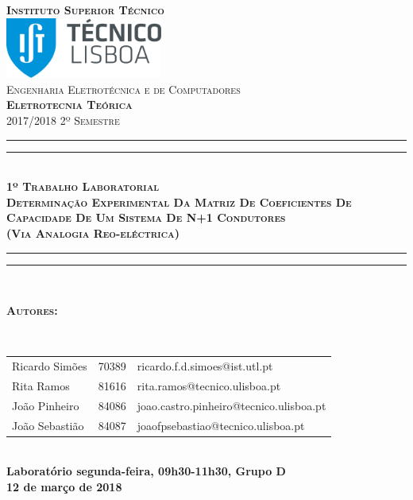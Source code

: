 \documentclass[11pt, a4paper, titlepage, portuguese]{article}
\begin{document}
	\begin{titlepage}
		\center
		\textsc{\bfseries\huge Instituto Superior Técnico}\\[1cm] %
		\includegraphics[height=2cm]{IST_Logo.pdf}\\[2.5cm]

		\textsc{\Large Engenharia Eletrotécnica e de Computadores}\\[0.5cm] %
		\textsc{\bfseries{\LARGE Eletrotecnia Teórica}}\\[0.5cm] %
		\textsc{\Large 2017/2018 2º Semestre}\\[1.5cm]

		\rule{\textwidth}{1.6pt}\vspace*{-\baselineskip}\vspace*{2pt} %
		\rule{\textwidth}{0.4pt}\\[\baselineskip] %
			\textsc{\Huge \bfseries 1º Trabalho Laboratorial}\\[0.2cm]
			\bigskip
			\textsc{\Large \bfseries Determinação Experimental Da Matriz De Coeficientes De Capacidade De Um Sistema De N+1 Condutores \\
			(Via Analogia Reo-eléctrica)}\\[0.2cm]
		\rule{\textwidth}{0.4pt}\vspace*{-\baselineskip}\vspace{3.2pt} %
		\rule{\textwidth}{1.6pt}\\[5cm]

		\begin{minipage}{0.9\textwidth}
			\begin{flushleft} \large
				\begin{Large}\bfseries\textsc{Autores:}\end{Large}\\[0.4cm]
				\begin{tabular}{l l l}
					Ricardo Simões			& 70389 & \normalsize ricardo.f.d.simoes@ist.utl.pt \\
					Rita Ramos					& 81616 & \normalsize rita.ramos@tecnico.ulisboa.pt \\
					João Pinheiro				& 84086 & \normalsize joao.castro.pinheiro@tecnico.ulisboa.pt \\
					João Sebastião			& 84087 & \normalsize joaofpsebastiao@tecnico.ulisboa.pt \\
				\end{tabular}
			\end{flushleft}
		\end{minipage}\\[0.5cm]

		\large \bfseries Laboratório segunda-feira, 09h30-11h30, Grupo D\\
		\large 12 de março de 2018\\[1cm]
		\setcounter{page}{0}
	\end{titlepage}
\end{document}
